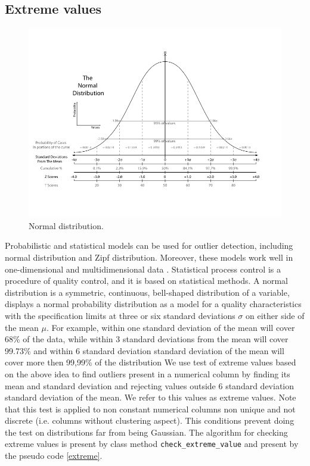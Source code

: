 \documentclass{article}
\begin{document}
\subsection{Extreme values} %
\label{sub:Extreme values}
\begin{figure}[H]
    \centering
    \includegraphics[width=0.8\linewidth]{picture/normal.png}
    \caption{Normal distribution.}
    \label{fig:normal}
\end{figure}
Probabilistic and statistical models can be used for outlier detection, including normal distribution and Zipf distribution. Moreover, these models work well in one-dimensional and
multidimensional data \cite{dai_yosh_pars}.
Statistical process control is a procedure of quality control, and it is based on statistical methods.
A normal distribution is a symmetric, continuous, bell-shaped distribution of a variable, displays a normal probability distribution as a model for a quality characteristics with the specification limits at three or six standard deviations $\sigma$ on either side of the mean $\mu$.
For example, within one standard deviation of the mean will cover 68\% of the data, while within 3 standard deviations from the mean will cover 99.73\% and within 6 standard deviation standard deviation of the mean will cover more then 99,99\% of the distribution
We use test of extreme values based on the above idea to find outliers present in a numerical column by finding its mean and standard deviation and rejecting values outside 6 standard deviation standard deviation of the mean.
We refer to this values as extreme values. Note that this test is applied to non constant numerical columns non unique and not discrete (i.e. columns without clustering aspect). This conditions prevent doing the test on distributions far from being Gaussian.
The algorithm for checking extreme values is present by class method \texttt{check\_extreme\_value}  and present by the pseudo code \ref{extreme}.
\end{document}
